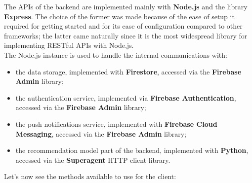 \documentclass[../../main]{subfiles}
\begin{document}
The APIs of the backend are implemented mainly with \textbf{Node.js} and the library \textbf{Express}.
The choice of the former was made because of the ease of setup it required for getting started and for its ease of configuration compared to other frameworks;
the latter came naturally since it is the most widespread library for implementing RESTful APIs with Node.js.\\
The Node.js instance is used to handle the internal communications with:
\begin{itemize}
    \item the data storage, implemented with \textbf{Firestore}, accessed via the \textbf{Firebase Admin} library;
    \item the authentication service, implemented via \textbf{Firebase Authentication}, accessed via the \textbf{Firebase Admin} library;
    \item the push notifications service, implemented with \textbf{Firebase Cloud Messaging}, accessed via the \textbf{Firebase Admin} library;
    \item the recommendation model part of the backend, implemented with \textbf{Python}, accessed via the \textbf{Superagent} HTTP client library.
\end{itemize}
\noindent
Let's now see the methods available to use for the client:
\end{document}

